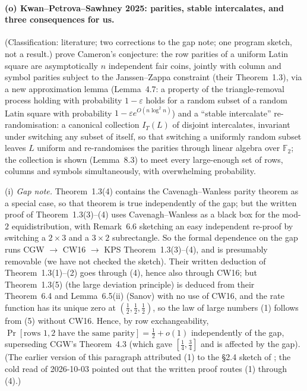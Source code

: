 \paragraph{(o) Kwan--Petrova--Sawhney 2025: parities, stable
intercalates, and three consequences for us.}  (Classification:
literature; two corrections to the gap note; one program sketch,
not a result.)  \cite{KPS25} prove Cameron's conjecture: the row
parities of a uniform Latin square are asymptotically $n$ independent
fair coins, jointly with column and symbol parities subject to the
Janssen--Zappa constraint (their Theorem~1.3), via a new approximation
lemma (Lemma~4.7: a property of the triangle-removal process holding
with probability $1-\varepsilon$ holds for a random subset of a random
Latin square with probability $1-\varepsilon e^{O(n\log^2n)}$) and a
``stable intercalate'' re-randomisation: a canonical collection
$I_T(L)$ of disjoint intercalates, invariant under switching any
subset of itself, so that switching a uniformly random subset leaves
$L$ uniform and re-randomises the parities through linear algebra over
$\mathbb F_2$; the collection is shown (Lemma~8.3) to meet every
large-enough set of rows, columns and symbols simultaneously, with
overwhelming probability.

(i) \emph{Gap note.}  Theorem~1.3(4) contains the Cavenagh--Wanless
parity theorem as a special case, so that theorem is true independently
of the gap; but the written proof of Theorem~1.3(3)--(4) uses
Cavenagh--Wanless as a black box for the mod-$2$ equidistribution, with
Remark~6.6 sketching an easy independent re-proof by switching a
$2\times3$ and a $3\times2$ subrectangle.  So the formal dependence on
the gap runs CGW $\to$ CW16 $\to$ KPS Theorem~1.3(3)--(4), and is
presumably removable (we have not checked the sketch).  Their written
deduction of Theorem~1.3(1)--(2) goes through (4), hence also through
CW16; but Theorem~1.3(5) (the large deviation principle) is deduced
from their Theorem~6.4 and Lemma~6.5(ii) (Sanov) with no use of CW16,
and the rate function has its unique zero at $(\frac12,\frac12,\frac12)$,
so the law of large numbers (1) follows from (5) without CW16.  Hence,
by row exchangeability,
$\Pr[\text{rows }1,2\text{ have the same parity}]=\tfrac12+o(1)$
independently of the gap, superseding CGW's Theorem~4.3 (which gave
$[\tfrac14,\tfrac34]$ and is affected by the gap).  (The earlier
version of this paragraph attributed (1) to the \S2.4 sketch of
\cite{KPS25}; the cold read of 2026-10-03 pointed out that the written
proof routes (1) through (4).)

